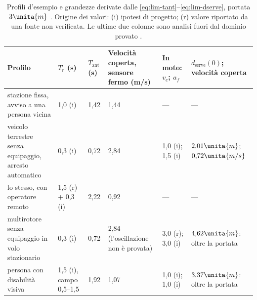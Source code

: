 \begin{table}[H]\centering\small
\caption{Profili d'esempio e grandezze derivate dalle \eqref{eq:lim-tant}--\eqref{eq:lim-dserve}, portata $3\unita{m}$ . Origine dei valori: (i) ipotesi di progetto; (r) valore riportato da una fonte non verificata. Le ultime due colonne sono analisi fuori dal dominio provato .}\label{tab:lim-portatore}
\begin{tabularx}{\linewidth}{@{}Lp{1.9cm}p{1.0cm}p{2.2cm}p{1.7cm}p{2.5cm}@{}}
\toprule
Profilo & $T_r$ (s) & $T_{\mathrm{ant}}$ (s) & Velocità coperta, sensore fermo (m/s) & In moto: $v_e$; $a_f$ & $d_{\mathrm{serve}}(0)$; velocità coperta\\
\midrule
stazione fissa, avviso a una persona vicina & 1,0 (i) & 1,42 & 1,44 & --- & ---\\
veicolo terrestre senza equipaggio, arresto automatico & 0,3 (i) & 0,72 & 2,84 & 1,0 (i); 1,5 (i) & $2{,}01\unita{m}$; $0{,}72\unita{m/s}$\\
lo stesso, con operatore remoto & 1,5 (r) + 0,3 (i) & 2,22 & 0,92 & --- & ---\\
multirotore senza equipaggio in volo stazionario & 0,3 (i) & 0,72 & 2,84 (l'oscillazione non è provata) & 3,0 (r); 3,0 (i) & $4{,}62\unita{m}$: oltre la portata\\
persona con disabilità visiva & 1,5 (i), campo 0,5--1,5 & 1,92 & 1,07 & 1,0 (i); 1,0 (i) & $3{,}37\unita{m}$: oltre la portata\\
\bottomrule
\end{tabularx}
\end{table}

